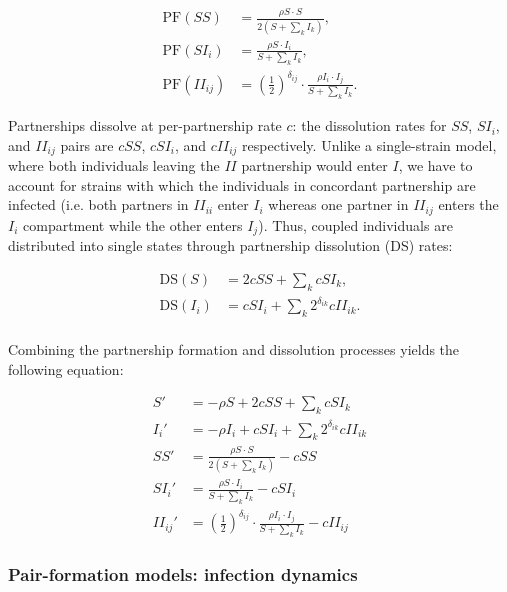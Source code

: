 \documentclass[10pt,letterpaper]{article}
\newcommand{\khalf}{\left(\frac{1}{2}\right)^{\delta_{ij}}}  %
\newcommand{\PF}{\textrm{PF}}
\newcommand{\DS}{\textrm{DS}}
\begin{document}
\begin{equation}
\begin{aligned}
\PF(SS) &= \frac{\rho S \cdot S}{2 (S + \sum_k I_k)},\\
\PF(SI_i) &= \frac{\rho S \cdot I_i}{S + \sum_k I_k},\\
\PF(II_{ij}) &= \khalf \cdot \frac{\rho I_i \cdot I_j}{S + \sum_k I_k}.
\end{aligned}
\end{equation}

Partnerships dissolve at per-partnership rate $c$: the dissolution rates for $SS$, $SI_i$, and $II_{ij}$ pairs are $c SS$, $c SI_i$, and $c II_{ij}$ respectively. Unlike a single-strain model, where both individuals leaving the $II$ partnership would enter $I$, we have to account for strains with which the individuals in concordant partnership are infected (i.e. both partners in $II_{ii}$ enter $I_i$ whereas one partner in $II_{ij}$ enters the $I_i$ compartment while the other enters $I_j$). Thus, coupled individuals are distributed into single states through partnership dissolution (DS) rates:

\begin{equation}
\begin{aligned}
\DS(S) &= 2 c SS + \sum_k c SI_k, \\
\DS(I_i) &= c SI_i + \sum_k 2^{\delta_{ik}} c II_{ik}.\\
\end{aligned}
\end{equation}

Combining the partnership formation and dissolution processes yields the following equation:

\begin{equation}
\begin{aligned}
S' &= - \rho S + 2 c SS + \sum_k c SI_k \\
I_i' &= - \rho I_i + c SI_i + \sum_k 2^{\delta_{ik}} c II_{ik}\\
SS' &= \frac{\rho S \cdot S}{2 (S + \sum_k I_k)} - c SS\\
SI_i' &= \frac{\rho S \cdot I_i}{S + \sum_k I_k} - c SI_i\\
II_{ij}' &= \khalf \cdot \frac{\rho I_i \cdot I_j}{S + \sum_k I_k} - c II_{ij}
\end{aligned}
\end{equation}

\subsubsection*{Pair-formation models: infection dynamics}
\end{document}
